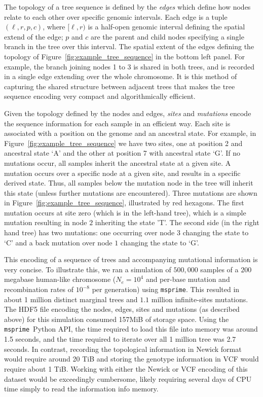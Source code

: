 \documentclass{article}
\newcommand{\msprime}{\texttt{msprime}}
\begin{document}
The topology of a tree sequence is defined by the \emph{edges} which define how
nodes relate to each other over specific genomic intervals. Each edge is a tuple
$(\ell, r, p, c)$, where $[\ell, r)$ is a half-open genomic interval defining the
spatial extend of the edge; $p$ and $c$ are the parent and child nodes specifying
a single branch in the tree over this interval. The spatial extent of the
edges defining the topology of Figure~\ref{fig:example_tree_sequence} in the
bottom left panel. For example, the branch joining nodes 1 to 3 is shared in both trees,
and is recorded in a single edge extending over the whole chromosome. It is this
method of capturing the shared structure between adjacent trees that makes the
tree sequence encoding very compact and algorithmically efficient.

Given the topology defined by the nodes and edges, \emph{sites} and \emph{mutations}
encode the sequence information for each sample in an efficient way. Each site
is associated with a position on the genome and an ancestral state. For example,
in Figure~\ref{fig:example_tree_sequence} we have two sites, one at position
2 and ancestral state `A' and the other at position 7 with ancestral state `G'. If
no mutations occur, all samples inherit the ancestral state at a given site.
A mutation occurs over a specific node at a given site, and results in a specific
derived state. Thus, all samples below the mutation node in the tree will inherit
this state (unless further mutations are encountered). Three mutations are shown
in Figure~\ref{fig:example_tree_sequence}, illustrated by red hexagons. The first
mutation occurs at site zero (which is in the left-hand tree), which is a simple
mutation resulting in node $2$ inheriting the state 'T'. The second side (in the
right hand tree) has two mutations: one occurring over node $3$ changing the state to
`C' and a back mutation over node $1$ changing the state to `G'.

This encoding of a sequence of trees and accompanying mutational information is
very concise. To illustrate this, we ran a simulation of $500,000$ samples of a
$200$ megabase human-like chromosome ($N_e=10^4$ and per-base mutation and
recombination rates of $10^{-8}$ per generation) using \msprime. This resulted
in about 1 million distinct marginal trees and $1.1$ million infinite-sites
mutations. The HDF5 file encoding the nodes, edges, sites and mutations (as
described above) for this simulation consumed 157MiB of storage space. Using
the \msprime\ Python API, the time required to load this file into memory was
around 1.5 seconds, and the time required to iterate over all 1 million tree
was 2.7 seconds. In contrast, recording the topological information in Newick
format would require around 20 TiB and storing the genotype information
in VCF would require about 1 TiB. Working with either the Newick or VCF encoding
of this dataset would be exceedingly cumbersome, likely requiring several
days of CPU time simply to read the information info memory.
\end{document}
